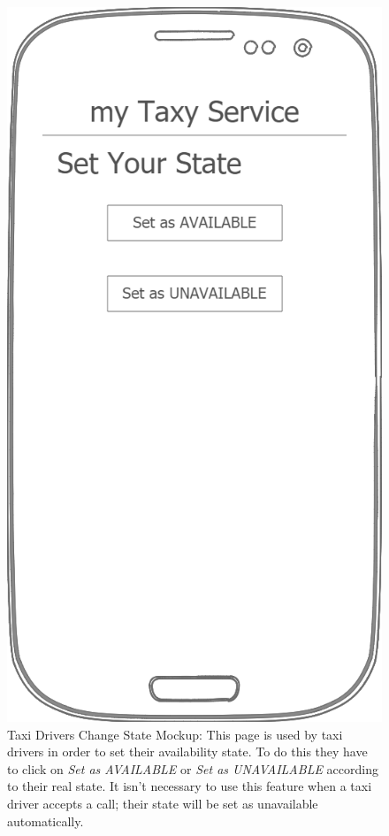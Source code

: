 \documentclass[a4paper]{article}
\begin{document}
\begin{figure}[H]
\includegraphics[width=\mockupWidth]{Mockup-TaxiDriversSetStatus}
\centering
\caption[Taxi Drivers Change State Mockup]{Taxi Drivers Change State Mockup: \newline This page is used by taxi drivers in order to set their availability state. To do this they have to click on \emph{Set as AVAILABLE} or \emph{Set as UNAVAILABLE} according to their real state. It isn't necessary to use this feature when a taxi driver accepts a call; their state will be set as unavailable automatically.}
\label{fig:mockuptaxidriversetstatus}
\end{figure}
\end{document}

